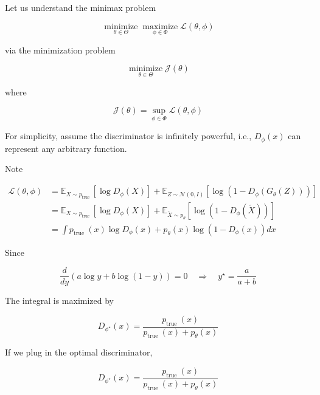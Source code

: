 \documentclass{report}
\begin{document}
\begin{concept}
    Let us understand the minimax problem

    $$
    \underset{\theta \in \Theta}{\operatorname{minimize}} \underset{\phi \in \Phi}{\operatorname{maximize}} \mathcal{L}(\theta, \phi)
    $$

    via the minimization problem

    $$
    \underset{\theta \in \Theta}{\operatorname{minimize}} \mathcal{J}(\theta)
    $$

    where

    $$
    \mathcal{J}(\theta)=\sup _{\phi \in \Phi} \mathcal{L}(\theta, \phi)
    $$

    For simplicity, assume the discriminator is infinitely powerful, i.e., $D_{\phi}(x)$ can represent any arbitrary function.

    \par\noindent\textcolor{gray}{\hdashrule{\textwidth}{0.4pt}{1pt 2pt}}

    Note

    $$
    \begin{aligned}
    \mathcal{L}(\theta, \phi) & =\mathbb{E}_{X \sim p_{\text {true }}}\left[\log D_{\phi}(X)\right]+\mathbb{E}_{Z \sim \mathcal{N}(0, I)}\left[\log \left(1-D_{\phi}\left(G_{\theta}(Z)\right)\right)\right] \\
    & =\mathbb{E}_{X \sim p_{\text {true }}}\left[\log D_{\phi}(X)\right]+\mathbb{E}_{\tilde{X} \sim p_{\theta}}\left[\log \left(1-D_{\phi}(\tilde{X})\right)\right] \\
    & =\int p_{\text {true }}(x) \log D_{\phi}(x)+p_{\theta}(x) \log \left(1-D_{\phi}(x)\right) d x
    \end{aligned}
    $$

    Since

    $$
    \frac{d}{d y}(a \log y+b \log (1-y))=0 \quad \Rightarrow \quad y^{\star}=\frac{a}{a+b}
    $$

    The integral is maximized by

    $$
    D_{\phi^{\star}}(x)=\frac{p_{\text {true }}(x)}{p_{\text {true }}(x)+p_{\theta}(x)}
    $$

    \par\noindent\textcolor{gray}{\hdashrule{\textwidth}{0.4pt}{1pt 2pt}}

    If we plug in the optimal discriminator,

    $$
    D_{\phi^{\star}}(x)=\frac{p_{\text {true }}(x)}{p_{\text {true }}(x)+p_{\theta}(x)}
    $$


\end{concept}
\end{document}
